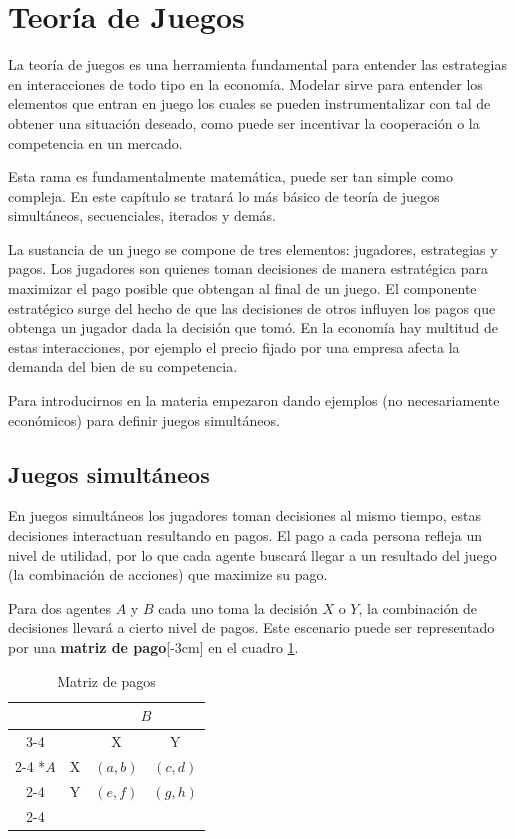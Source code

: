 \section{Teoría de Juegos}

La teoría de juegos es una herramienta fundamental para entender las estrategias en interacciones de todo tipo en la economía. Modelar sirve para entender los elementos que entran en juego los cuales se pueden instrumentalizar con tal de obtener una situación deseado, como puede ser incentivar la cooperación o la competencia en un mercado. 

Esta rama es fundamentalmente matemática, puede ser tan simple como compleja. En este capítulo se tratará lo más básico de teoría de juegos simultáneos, secuenciales, iterados y demás. 

La sustancia de un juego se compone de tres elementos: jugadores, estrategias y pagos. Los jugadores son quienes toman decisiones de manera estratégica para maximizar el pago posible que obtengan al final de un juego. El componente estratégico surge del hecho de que las decisiones de otros influyen los pagos que obtenga un jugador dada la decisión que tomó. En la economía hay multitud de estas interacciones, por ejemplo el precio fijado por una empresa afecta la demanda del bien de su competencia. 

Para introducirnos en la materia empezaron dando ejemplos (no necesariamente económicos) para definir juegos simultáneos.

\subsection{Juegos simultáneos}

En juegos simultáneos los jugadores toman decisiones al mismo tiempo, estas decisiones interactuan resultando en pagos. El pago a cada persona refleja un nivel de utilidad, por lo que cada agente buscará llegar a un resultado del juego (la combinación de acciones) que maximize su pago. 

Para dos agentes $A$ y $B$ cada uno toma la decisión $X$ o $Y$, la combinación de decisiones llevará a cierto nivel de pagos. Este escenario puede ser representado por una \textbf{matriz de pago}[-3cm] en el cuadro \ref{cuadro: matriz de pago genérica}.

\begin{table}[!htbp]
  
  \centering
  \caption{Matriz de pagos}
  \setlength{\extrarowheight}{2pt}
  \label{cuadro: matriz de pago genérica}
  \begin{tabular}{*{4}{c|}}
    \multicolumn{2}{c}{} & \multicolumn{2}{c}{$B$}\\\cline{3-4}
    \multicolumn{1}{c}{} &  & X  & Y \\\cline{2-4}
    \multirow{2}*{$A$}  & X & $(a,b)$ & $(c,d)$ \\\cline{2-4}
    & Y & $(e,f)$ & $(g,h)$ \\\cline{2-4} 
  \end{tabular}
\end{table}

